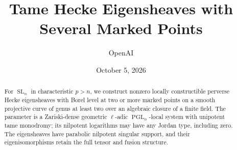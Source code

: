 \documentclass[11pt]{article}
\title{Tame Hecke Eigensheaves with Several Marked Points}
\author{OpenAI}
\date{October 5, 2026}
\theoremstyle{definition}
\theoremstyle{remark}
\DeclareMathOperator{\SL}{SL}
\DeclareMathOperator{\PGL}{PGL}
\numberwithin{equation}{section}
\begin{document}
\maketitle
\begin{abstract}
For $\SL_n$ in characteristic $p>n$, we construct nonzero locally constructible
perverse Hecke eigensheaves with Borel level at two or more marked points on a
smooth projective curve of genus at least two over an algebraic closure of a
finite field. The parameter is a Zariski-dense geometric $\ell$-adic
$\PGL_n$-local system with unipotent tame monodromy; its nilpotent logarithms
may have any Jordan type, including zero. The eigensheaves have parabolic
nilpotent singular support, and their eigenisomorphisms retain the full tensor
and fusion structure.
\end{abstract}
\setcounter{tocdepth}{1}
\tableofcontents
\clearpage









\end{document}
